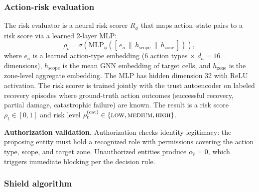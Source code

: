 \documentclass[10pt,journal,compsoc]{IEEEtran}
\begin{document}
\subsubsection{Action-risk evaluation}
The risk evaluator is a neural risk scorer $R_\phi$ that maps action--state pairs to a risk score via a learned 2-layer MLP:
\[
\rho_t = \sigma\!\left(\mathrm{MLP}_\phi\!\left([\,e_a \,\|\, h_{\mathrm{scope}} \,\|\, h_{\mathrm{zone}}\,]\right)\right),
\]
where $e_a$ is a learned action-type embedding (6 action types $\times$ $d_a = 16$ dimensions), $h_{\mathrm{scope}}$ is the mean GNN embedding of target cells, and $h_{\mathrm{zone}}$ is the zone-level aggregate embedding.
The MLP has hidden dimension 32 with ReLU activation.
The risk scorer is trained jointly with the trust autoencoder on labeled recovery episodes where ground-truth action outcomes (successful recovery, partial damage, catastrophic failure) are known.
The result is a risk score $\rho_t \in [0,1]$ and risk level $\rho_t^{(\mathrm{cat})} \in \{\textsc{low}, \textsc{medium}, \textsc{high}\}$.

\noindent\textbf{Authorization validation.}
Authorization checks identity legitimacy: the proposing entity must hold a recognized role with permissions covering the action type, scope, and target zone.
Unauthorized entities produce $\alpha_t = 0$, which triggers immediate blocking per the decision rule.

\subsubsection{Shield algorithm}
\end{document}
